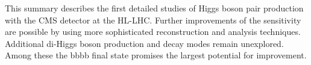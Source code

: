 This summary describes the first detailed studies of Higgs boson pair production with the CMS \phasetwo detector at the HL-LHC. Further improvements of the sensitivity are possible by using more sophisticated reconstruction and analysis techniques. Additional di-Higgs boson production and decay modes remain unexplored. Among these the bbbb final state promises the largest potential for improvement.

